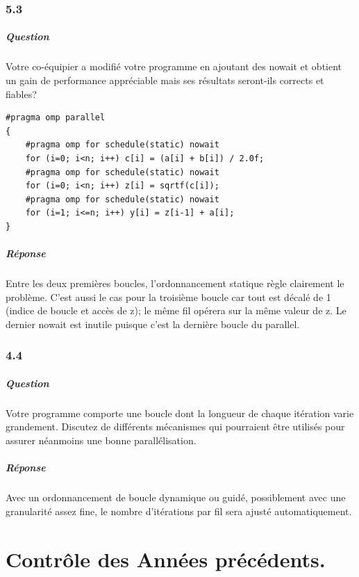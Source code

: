 \documentclass[oneside]{book}
\begin{document}
\subsection{5.3}
\paragraph{Question}
Votre co-équipier a modifié votre programme en ajoutant des nowait et obtient un
gain de performance appréciable mais ses résultats seront-ils corrects et fiables?

\begin{lstlisting}
#pragma omp parallel
{ 
	#pragma omp for schedule(static) nowait
	for (i=0; i<n; i++) c[i] = (a[i] + b[i]) / 2.0f;
	#pragma omp for schedule(static) nowait
	for (i=0; i<n; i++) z[i] = sqrtf(c[i]);
	#pragma omp for schedule(static) nowait
	for (i=1; i<=n; i++) y[i] = z[i-1] + a[i];
}
\end{lstlisting}

\paragraph{Réponse}
Entre les deux premières boucles, l'ordonnancement statique règle clairement le
problème. C'est aussi le cas pour la troisième boucle car tout est décalé de 1
(indice de boucle et accès de z); le même fil opérera sur la même valeur de z. Le
dernier nowait est inutile puisque c'est la dernière boucle du parallel.

\subsection{4.4}
\paragraph{Question}
Votre programme comporte une boucle dont la longueur de chaque itération varie
grandement. Discutez de différents mécanismes qui pourraient être utilisés pour
assurer néanmoins une bonne parallélisation.
\paragraph{Réponse}
Avec un ordonnancement de boucle dynamique ou guidé, possiblement avec
une granularité assez fine, le nombre d'itérations par fil sera ajusté
automatiquement.


\chapter{Contrôle des Années précédents.}
\end{document}
